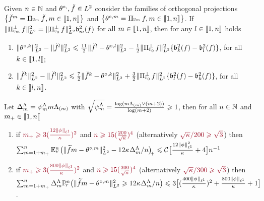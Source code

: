 \begin{cor}\label{re:contr}Given $\ssY\in\Nz$ and
  $\xdfPr[],\dxdfPr[]\in\Lp^2$ consider the
  families of  orthogonal projections
  $\setB{\dxdfPr=\dProj{\Di}{}\dxdfPr[],\Di\in\nset{1,n}}$ and $\setB{\xdfPr=\dProj{\Di}{}\xdf,\Di\in\nset{1,n}}$. If $\VnormLp{\dProj{\Di}{}^\perp\xdf}^2=\VnormLp{\Proj[{\mHiH[0]}]^\perp\xdf}^2\bias^2(\xdf)$ for all
  $\Di\in\nset{1,\ssY}$, then for any $l\in\nset{1,n}$ holds
\begin{enumerate}[label=\emph{\textbf{(\roman*)}},ref=\emph{\textbf{(\roman*)}}]\addtocounter{enumi}{0}
\item\label{re:contr:e1}
$\VnormLp{\xdfPr[k]}^2-\VnormLp{\dxdfPr[l]}^2\leq
\tfrac{11}{2}\VnormLp{\dxdfPr[l]-\xdfPr[l]}^2-\tfrac{1}{2}\VnormLp{\Proj[{\mHiH[0]}]^\perp\xdf}^2\{\bias[k]^2(\xdf)-\bias[l]^2(\xdf)\}$,
for all $k\in\nsetro{1,l}$;
\item\label{re:contr:e2}
$\VnormLp{\dxdfPr[k]}^2-\VnormLp{\dxdfPr[l]}^2\leq \tfrac{7}{2}\VnormLp{\dxdfPr[k]-\xdfPr[k]}^2+\tfrac{3}{2}\VnormLp{\Proj[{\mHiH[0]}]^\perp\xdf}^2
\{\bias[l]^2(\xdf)-\bias[k]^2(\xdf)\}$, for all $k\in\nsetlo{l,n}$.
\end{enumerate}
\end{cor}

\begin{lm}\label{re:rest}Let $\DipenSv=\cmSv \Di \miSv$
  with $\sqrt{\cmiSv}=\tfrac{\log (\Di\miSv \vee
    (\Di+2))}{\log(\Di+2)}\geq1$,  then for all $\ssY\in\Nz$ and $\pDi\in\nsetro{1,\ssY}$
\begin{enumerate}[label=\emph{\textbf{(\roman*)}},ref=\emph{\textbf{(\roman*)}}]\addtocounter{enumi}{0}
\item\label{re:rest:i} if $\dr\pDi\geq
  3(\tfrac{12\Vnormlp[1]{\fydf}}{\cpen})^2$ and $\dr n\geq
  15(\tfrac{200}{\sqrt{\cpen}})^4$
   (alternatively $\dr\sqrt{\cpen}/200\geq\sqrt{3}$) then\\ 
  $\sum_{\Di=1+\pDi}^{\ssY}\FuEx[\ssY]{\rY}\vectp{\VnormLp{\txdfPr[\Di]-\xdfPr[\Di]}^2-12\cpen\DipenSv/\ssY}\leq \cst{}\big[\tfrac{12\Vnormlp[1]{\fydf}^2}{\cpen}+4\big]\ssY^{-1}$
\item\label{re:rest:ii} if
  $\dr\pDi\geq3(\tfrac{800\Vnormlp[1]{\fydf}}{\cpen})^2$ and
  $\dr n\geq
  15(\tfrac{300}{\sqrt{\cpen}})^4$ (alternatively $\dr\sqrt{\cpen}/300\geq\sqrt{3}$) then\\
  $\sum_{\Di=1+\pDi}^{\ssY}\DipenSv[\Di]\FuVg[\ssY]{\rY}\big(\VnormLp{\txdfPr[\Di]-\xdfPr[\Di]}^2\geq12\cpen\DipenSv/\ssY\big)\leq3\big[
(\tfrac{400\Vnormlp[1]{\fydf}}{\cpen})^2+\tfrac{800\Vnormlp[1]{\fydf}}{\cpen}
+ 1\big]$.
\end{enumerate}
\end{lm}

